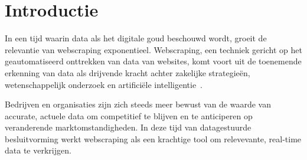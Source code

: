 
\section{Introductie}%
\label{sec:introductie}

In een tijd waarin data als het digitale goud beschouwd wordt, groeit de relevantie van webscraping exponentieel.
Webscraping, een techniek gericht op het geautomatiseerd onttrekken van data van websites, komt voort uit de toenemende 
erkenning van data als drijvende kracht achter zakelijke strategieën, wetenschappelijk onderzoek en artificiële intelligentie~\autocite{RizaOeztuerk2023}.

Bedrijven en organisaties zijn zich steeds meer bewust van de waarde van accurate, actuele data om competitief te blijven
en te anticiperen op veranderende marktomstandigheden. In deze tijd van datagestuurde besluitvorming werkt webscraping als
een krachtige tool om relevevante, real-time data te verkrijgen.

